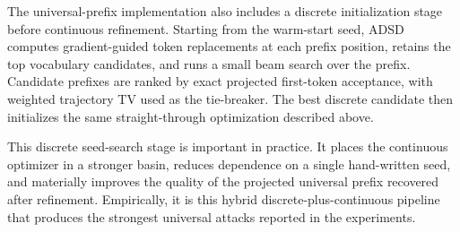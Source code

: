 The universal-prefix implementation also includes a discrete initialization
stage before continuous refinement. Starting from the warm-start seed, ADSD
computes gradient-guided token replacements at each prefix position, retains
the top vocabulary candidates, and runs a small beam search over the prefix.
Candidate prefixes are ranked by exact projected first-token acceptance, with
weighted trajectory TV used as the tie-breaker. The best discrete candidate
then initializes the same straight-through optimization described above.

This discrete seed-search stage is important in practice. It places the
continuous optimizer in a stronger basin, reduces dependence on a single
hand-written seed, and materially improves the quality of the projected
universal prefix recovered after refinement. Empirically, it is this hybrid
discrete-plus-continuous pipeline that produces the strongest universal attacks
reported in the experiments.
